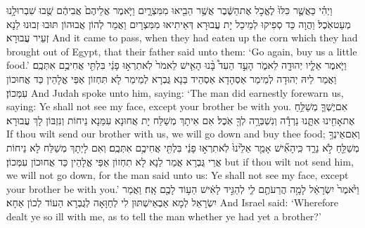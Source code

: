{וַיְהִ֗י כַּאֲשֶׁ֤ר כִּלּוּ֙ לֶאֱכֹ֣ל אֶת\maqqaf הַשֶּׁ֔בֶר אֲשֶׁ֥ר הֵבִ֖יאוּ מִמִּצְרָ֑יִם וַיֹּ֤אמֶר אֲלֵיהֶם֙ אֲבִיהֶ֔ם שֻׁ֖בוּ שִׁבְרוּ\maqqaf לָ֥נוּ מְעַט\maqqaf אֹֽכֶל׃}
{וַהֲוָה כַּד סְפִיקוּ לְמֵיכַל יָת עֲבוּרָא דְּאֵיתִיאוּ מִמִּצְרָיִם וַאֲמַר לְהוֹן אֲבוּהוֹן תּוּבוּ זְבוּנוּ לַנָא זְעֵיר עֲבוּרָא׃}
{And it came to pass, when they had eaten up the corn which they had brought out of Egypt, that their father said unto them: ‘Go again, buy us a little food.’}{}
{וַיֹּ֧אמֶר אֵלָ֛יו יְהוּדָ֖ה לֵאמֹ֑ר הָעֵ֣ד הֵעִד֩ בָּ֨נוּ הָאִ֤ישׁ לֵאמֹר֙ לֹֽא\maqqaf תִרְא֣וּ פָנַ֔י בִּלְתִּ֖י אֲחִיכֶ֥ם אִתְּכֶֽם׃}
{וַאֲמַר לֵיהּ יְהוּדָה לְמֵימַר אַסְהָדָא אַסְהֵיד בַּנָא גֻּבְרָא לְמֵימַר לָא תִּחְזוֹן אַפַּי אֱלָהֵין כַּד אֲחוּכוֹן עִמְּכוֹן׃}
{And Judah spoke unto him, saying: ‘The man did earnestly forewarn us, saying: Ye shall not see my face, except your brother be with you.}{}
{אִם\maqqaf יֶשְׁךָ֛ מְשַׁלֵּ֥חַ אֶת\maqqaf אָחִ֖ינוּ אִתָּ֑נוּ נֵרְדָ֕ה וְנִשְׁבְּרָ֥ה לְךָ֖ אֹֽכֶל׃}
{אִם אִיתָךְ מְשַׁלַּח יָת אֲחוּנָא עִמַּנָא נֵיחוֹת וְנִזְבּוֹן לָךְ עֲבוּרָא׃}
{If thou wilt send our brother with us, we will go down and buy thee food;}{}
{וְאִם\maqqaf אֵינְךָ֥ מְשַׁלֵּ֖חַ לֹ֣א נֵרֵ֑ד כִּֽי\maqqaf הָאִ֞ישׁ אָמַ֤ר אֵלֵ֙ינוּ֙ לֹֽא\maqqaf תִרְא֣וּ פָנַ֔י בִּלְתִּ֖י אֲחִיכֶ֥ם אִתְּכֶֽם׃}
{וְאִם לָיְתָךְ מְשַׁלַּח לָא נֵיחוֹת אֲרֵי גֻּבְרָא אֲמַר לַנָא לָא תִחְזוֹן אַפַּי אֱלָהֵין כַּד אֲחוּכוֹן עִמְּכוֹן׃}
{but if thou wilt not send him, we will not go down, for the man said unto us: Ye shall not see my face, except your brother be with you.’}{}
{וַיֹּ֙אמֶר֙ יִשְׂרָאֵ֔ל לָמָ֥ה הֲרֵעֹתֶ֖ם לִ֑י לְהַגִּ֣יד לָאִ֔ישׁ הַע֥וֹד לָכֶ֖ם אָֽח׃}
{וַאֲמַר יִשְׂרָאֵל לְמָא אַבְאֵישְׁתּוּן לִי לְחַוָּאָה לְגֻבְרָא הַעוֹד לְכוֹן אַחָא׃}
{And Israel said: ‘Wherefore dealt ye so ill with me, as to tell the man whether ye had yet a brother?’}{}
